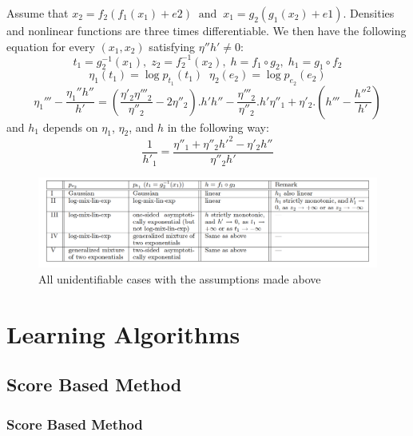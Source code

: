 \documentclass{beamer}
\begin{document}
\begin{frame}
\begin{theorem}
\begin{small}
Assume that $x_2 = f_2(f_1(x_1) + e2) \;\;\mathrm{and} \;\;x_1 = g_2(g_1(x_2) + e1)$.
 Densities and nonlinear functions are three times differentiable. We then have the following equation for every $(x_1, x_2)$ satisfying $\eta''h'\neq 0$:
 $$t_1 = g_2^{-1}(x_1),\; z_2 = f_2^{-1}(x_2),\; h = f_1\circ g_2,\; h_1 = g_1 \circ f_2$$
 $$\eta_1(t_1) = \log p_{t_1}(t_1) \;\; \eta_2(e_2) = \log p_{e_2}(e_2)$$
 $$\eta_1''' - \frac{\eta_1'' h''}{h'} = (\frac{\eta'_2 \eta'''_2}{\eta''_2} - 2 \eta''_2).h' h'' - \frac{\eta'''_2}{\eta''_2}.h'\eta''_1 + \eta'_2.(h'''-\frac{h''^2}{h'})$$
 and  $h_1$ depends on $\eta_1$, $\eta_2$, and $h$ in the following way:
 $$\frac{1}{h'_1} = \frac{\eta''_1 + \eta''_2h'^2-\eta'_2h''}{\eta''_2h'}$$
\end{small}
\end{theorem}
\end{frame}
\begin{frame}
\begin{figure}
	\centering
	\includegraphics[scale=0.2]{PNL.png}
	\caption{All unidentifiable cases with the assumptions made above}
\end{figure}
\end{frame}

\section{Learning Algorithms}
\subsection{Score Based Method}
\begin{frame}
\frametitle{Score Based Method}
\end{frame}
\end{document}
